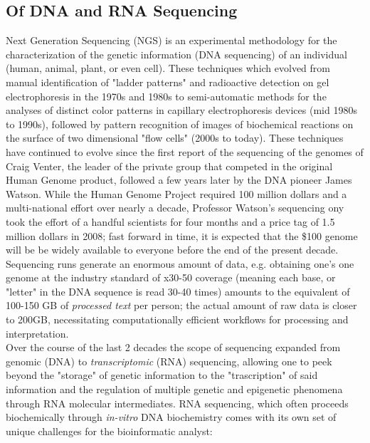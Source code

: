 \documentclass[10pt]{article}
\begin{document}
\subsection{Of DNA and RNA Sequencing}\label{sec:RNADNAsequencing} 
Next Generation Sequencing (NGS) is an experimental methodology for the characterization of the genetic information (DNA sequencing) of an individual (human, animal, plant, or even cell). These techniques which evolved\cite{genomics_brief_2021} from manual identification of "ladder patterns" and radioactive detection on gel electrophoresis in the 1970s and 1980s to semi-automatic methods for the analyses of distinct color patterns in capillary electrophoresis devices (mid 1980s to 1990s), followed by pattern recognition of images of biochemical reactions on the surface of two dimensional "flow cells" (2000s to today). These techniques have continued to evolve since the first report of the sequencing of the genomes of Craig Venter, the leader of the private group that competed in the original Human Genome product, followed a few years later by the DNA pioneer James Watson\cite{wadman_james_2008}. While the Human Genome Project required 100 million dollars and a multi-national effort over nearly a decade, Professor Watson's sequencing ony took the effort of a handful scientists for four months and a price tag of 1.5 million dollars in 2008; fast forward in time, it is expected that the \$100 genome will be be widely available to everyone before the end of the present decade. Sequencing runs generate an enormous amount of data, e.g. obtaining one's one genome at the industry standard of x30-50 coverage (meaning each base, or "letter" in the DNA sequence is read 30-40 times) amounts to the equivalent of 100-150 GB of \textit{processed text} per person; the actual amount of raw data is closer to 200GB, necessitating computationally efficient workflows for processing and interpretation.
\\
Over the course of the last 2 decades the scope of sequencing expanded from genomic (DNA) to \textit{transcriptomic} (RNA) sequencing, allowing one to peek beyond the "storage" of genetic information to  the "trascription" of said information and the regulation of multiple genetic and epigenetic phenomena through RNA molecular intermediates. RNA sequencing, which often proceeds biochemically through \textit{in-vitro} DNA biochemistry comes with its own set of unique challenges for the bioinformatic analyst:
\end{document}
